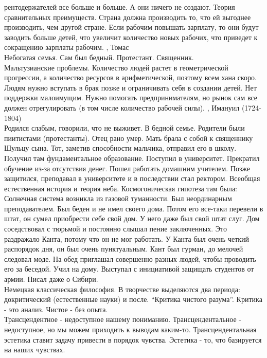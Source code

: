 \documentclass[a4paper,12pt]{report} %
\begin{document}
\begin{itemize}
  рентодержателей все больше и больше. А они ничего не создают. Теория
  сравнительных преимуществ. Страна должна производить то, что ей
  выгоднее производить, чем другой стране. Если рабочим повышать
  зарплату, то они будут заводить больше детей, что увеличит количество
  новых рабочих, что приведет к сокращению зарплаты рабочим.
, Томас\\
  Небогатая семья. Сам был бедный. Протестант. Священник.\\
  Мальтузианские проблемы. Количество людей растет в геометрической
  прогрессии, а количество ресурсов в арифметической, поэтому всем хана
  скоро. Людям нужно вступать в брак позже и ограничивать себя в
  создании детей. Нет поддержки малоимущим. Нужно помогать
  предпринимателям, но рынок сам все должен отрегулировать (в том числе
  количество рабочей силы).
, Имануил (1724-1804)\\
  Родился слабым, говорили, что не выживет. В бедной семье. Родители были
  пиитистами (протестанты). Отец рано умер. Мать брала с собой к священнику Шульцу
  сына. Тот, заметив способности мальчика, отправил его в школу. Получил
  там фундаментальное образование. Поступил в университет. Прекратил
  обучение из-за отсутствия денег. Пошел работать домашним
  учителем. Позже защитился, преподавал в университете и в последствии
  стал ректором. Всеобщая естественная история и теория
  неба. Космогоническая гипотеза там была: Солнечная система возникла из
  газовой туманности. Был неординарным преподавателем. Был беден и не
  имел своего дома. Потом его все-таки перевели в штат, он сумел
  приобрести себе свой дом. У него даже был свой штат слуг. Дом
  соседствовал с тюрьмой и постоянно слышал пение заключенных. Это
  раздражало Канта, потому что он не мог работать. У Канта был очень
  четкий распорядок дня, он был очень пунктуальным. Кант был гурман, до
  мелочей следовал моде. На обед приглашал совершенно разных людей,
  чтобы проводить его за беседой. Учил на дому. Выступал с инициативой
  защищать студентов от армии. Писал даже о Сибири.\\
  Немецкая классическая философия. В творчестве выделяются два периода:
  докритический (естественные науки) и после. ``Критика чистого
  разума''. Критика - это анализ. Чистое - без опыта.\\
  Трансцендентное - недоступное нашему пониманию.
  Трансцендентальное - недоступное, но мы можем приходить к выводам
  каким-то.
  Трансцендентальная эстетика ставит задачу привести в порядок
  чувства. Эстетика - то, что базируется на наших чувствах.\\

\end{itemize}
\end{document}
